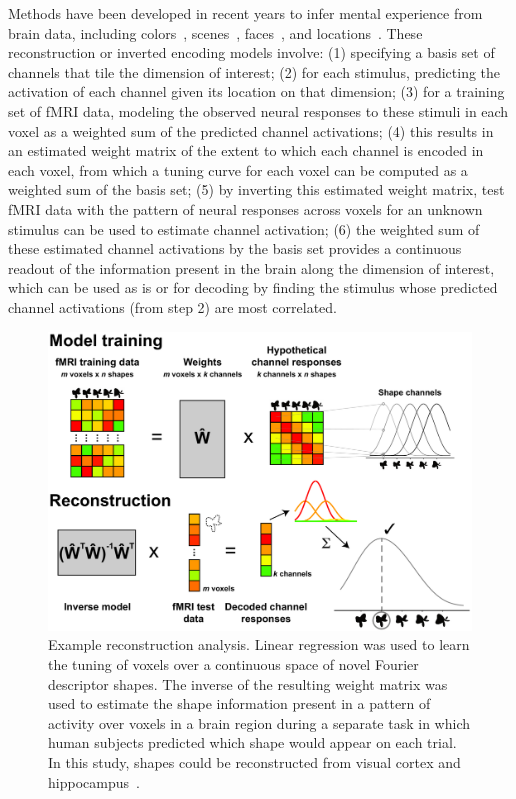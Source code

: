 Methods have been developed in recent years to infer
mental experience from brain data, including
colors~\citep{Brouwer:2009}, scenes~\citep{Naselaris:2009},
faces~\citep{Cowen:2014}, and locations~\citep{Sprague:2016}. These 
reconstruction or inverted encoding models
involve: (1) specifying a basis set of channels that tile the
dimension of interest; (2) for each stimulus, predicting the activation of each
channel given its location on
that dimension; (3) for a training set of fMRI data, modeling the
observed neural responses to these stimuli in each voxel as a weighted
sum of the predicted channel activations; (4) this results in an
estimated weight matrix of the extent to which each channel is encoded
in each voxel, from which a tuning curve for each voxel can be
computed as a weighted sum of the basis set; (5) by inverting this
estimated weight matrix, test fMRI data with the pattern of neural
responses across voxels for an unknown stimulus can be used to
estimate channel activation; (6) the weighted sum of these estimated
channel activations by the basis set provides a continuous readout of
the information present in the brain along the dimension of interest,
which can be used as is or for decoding by finding the stimulus whose
predicted channel activations (from step 2) are most correlated.

\setlength{\columnsep}{20pt}
\begin{figure}
\centering
\includegraphics[width=.48\textwidth]{figs/inverse}
\caption{\small Example reconstruction analysis. Linear regression was
used to learn the tuning of voxels over a continuous space of novel
Fourier descriptor shapes. The inverse of the resulting weight matrix
was used to estimate the shape information present in a pattern of
activity over voxels in a brain region during a separate task in which
human subjects predicted which shape would appear on each trial.
In this study, shapes could be reconstructed from visual cortex and
hippocampus~\citep{Kok:2018}.}
    \label{fig:hippo}
    \vskip2pt
\end{figure}

